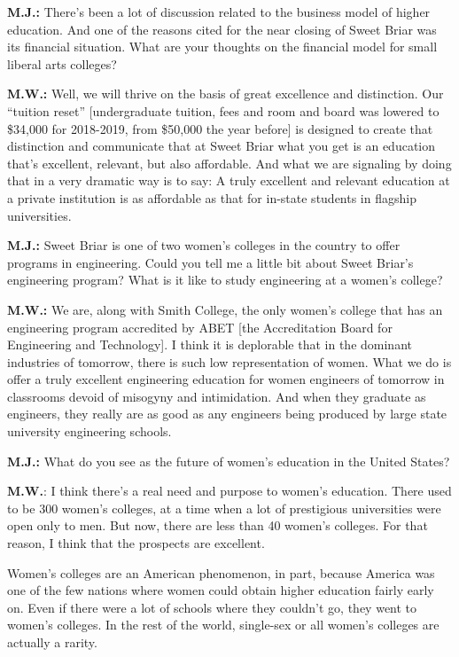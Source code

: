 \textbf{M.J.:} There's been a lot of discussion related to the business
model of higher education. And one of the reasons cited for the near
closing of Sweet Briar was its financial situation. What are your
thoughts on the financial model for small liberal arts colleges?

\textbf{M.W.:} Well, we will thrive on the basis of great excellence and
distinction. Our ``tuition reset'' {[}undergraduate tuition, fees and
room and board was lowered to \$34,000 for 2018-2019, from \$50,000 the
year before{]} is designed to create that distinction and communicate
that at Sweet Briar what you get is an education that's excellent,
relevant, but also affordable. And what we are signaling by doing that
in a very dramatic way is to say: A truly excellent and relevant
education at a private institution is as affordable as that for in-state
students in flagship universities.

\textbf{M.J.:} Sweet Briar is one of two women's colleges in the country
to offer programs in engineering. Could you tell me a little bit about
Sweet Briar's engineering program? What is it like to study engineering
at a women's college?

\textbf{M.W.:} We are, along with Smith College, the only women's
college that has an engineering program accredited by ABET {[}the
Accreditation Board for Engineering and Technology{]}. I think it is
deplorable that in the dominant industries of tomorrow, there is such
low representation of women. What we do is offer a truly excellent
engineering education for women engineers of tomorrow in classrooms
devoid of misogyny and intimidation. And when they graduate as
engineers, they really are as good as any engineers being produced by
large state university engineering schools.

\textbf{M.J.:} What do you see as the future of women's education in the
United States?

\textbf{M.W.}: I think there's a real need and purpose to women's
education. There used to be 300 women's colleges, at a time when a lot
of prestigious universities were open only to men. But now, there are
less than 40 women's colleges. For that reason, I think that the
prospects are excellent.

Women's colleges are an American phenomenon, in part, because America
was one of the few nations where women could obtain higher education
fairly early on. Even if there were a lot of schools where they couldn't
go, they went to women's colleges. In the rest of the world, single-sex
or all women's colleges are actually a rarity.

